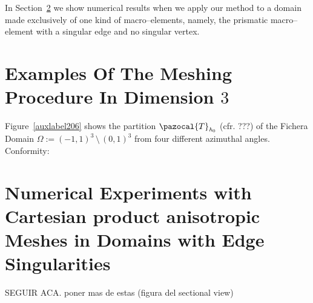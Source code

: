 In Section~\ref{auxlabel210} we show numerical results when we
apply our method to a domain made exclusively of one kind of macro--elements,
namely, the prismatic macro--element with a singular edge and no singular vertex.


\section{Examples Of The Meshing Procedure In Dimension $3$} %
\label{auxlabel211}
Figure~\ref{auxlabel206} shows the partition $\pazocal{T}_{\textit{h}_0}$ (cfr. ???) of the Fichera Domain 
$\Omega:=(-1,1)^3\,\setminus\,(0,1)^3$ from four different azimuthal angles.
\tauZero
\newpage
{}
\newpage
\tauOneEnCube
\tauOneEn
\newpage
Conformity:
\conform

\section{Numerical Experiments with Cartesian product anisotropic Meshes in Domains with Edge Singularities}
\label{auxlabel210}
\edgedomain
SEGUIR ACA. poner mas de estas (figura del sectional view)
\unifSection
\tableErrorsUniformCylinder
\tableErrorsAnisoCylinder


%
%